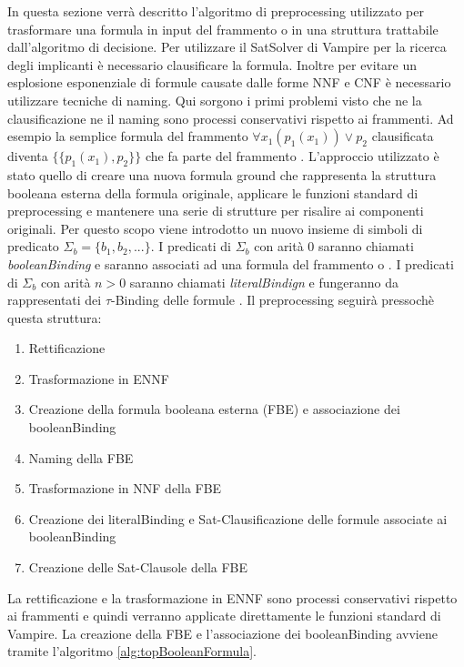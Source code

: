 \documentclass[./main.tex]{subfiles}
\begin{document}
In questa sezione verrà descritto l'algoritmo di preprocessing utilizzato per trasformare una formula in input
del frammento \ob o \cb in una struttura trattabile dall'algoritmo di decisione.
Per utilizzare il SatSolver di Vampire per la ricerca degli implicanti è necessario clausificare la formula.
Inoltre per evitare un esplosione esponenziale di formule causate dalle forme NNF e CNF è necessario utilizzare tecniche di naming.
Qui sorgono i primi problemi visto che ne la clausificazione ne il naming sono processi conservativi rispetto ai frammenti.
Ad esempio la semplice formula del frammento \ob $\forall x_1 (p_1(x_1)) \lor p_2$ clausificata diventa  $\{\{p_1(x_1), p_2\}\}$ che fa parte del frammento \dbb.
L'approccio utilizzato è stato quello di creare una nuova formula ground che rappresenta la struttura booleana esterna della formula originale,
applicare le funzioni standard di preprocessing
e mantenere una serie di strutture per risalire ai componenti originali.
Per questo scopo viene introdotto un nuovo insieme di simboli di predicato $\Sigma_b = \{b_1, b_2, ...\}$.
I predicati di $\Sigma_b$ con arità 0 saranno chiamati \textit{booleanBinding} e saranno associati ad una formula del frammento \ob o \cb.
I predicati di $\Sigma_b$ con arità $n > 0$ saranno chiamati \textit{literalBindign} e fungeranno da rappresentati dei $\tau$-Binding delle formule \ob.
Il preprocessing seguirà pressochè questa struttura:

\begin{enumerate}
    \item Rettificazione
    \item Trasformazione in ENNF
    \item Creazione della formula booleana esterna (FBE) e associazione dei booleanBinding
    \item Naming della FBE
    \item Trasformazione in NNF della FBE
    \item Creazione dei literalBinding e Sat-Clausificazione delle formule associate ai booleanBinding
    \item Creazione delle Sat-Clausole della FBE
\end{enumerate}

La rettificazione e la trasformazione in ENNF sono processi conservativi rispetto ai frammenti e quindi verranno applicate 
direttamente le funzioni standard di Vampire.
La creazione della FBE e l'associazione dei booleanBinding avviene tramite l'algoritmo \ref{alg:topBooleanFormula}.
\end{document}
